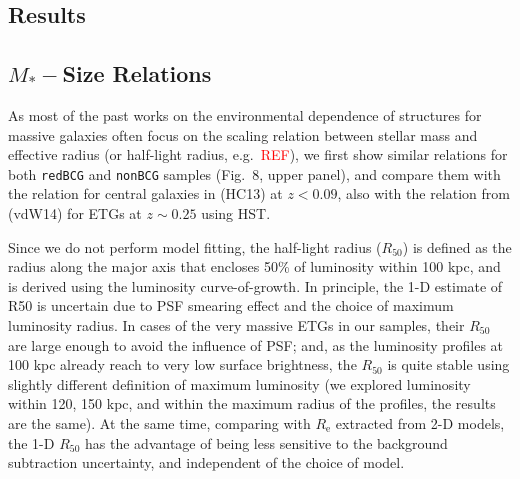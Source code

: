 \documentclass[preprint]{aastex}
\newcommand{\addref}{{\textcolor{red}{REF}}}
\begin{document}
\begin{CJK*}{UTF8}{gbsn}

\section{Results}

\subsection{$M_{\ast}-$Size Relations}

    As most of the past works on the environmental dependence of structures for 
    massive galaxies often focus on the scaling relation between stellar mass
    and effective radius (or half-light radius, e.g.\ \addref), we first show 
    similar relations for both \texttt{redBCG} and \texttt{nonBCG} samples
    (Fig.~8, upper panel), and compare them with the relation for central 
    galaxies in \citealt{HCompany13} (HC13) at $z<0.09$, also with the relation 
    from \citealt{vanderWel2014} (vdW14) for ETGs at $z\sim 0.25$ using HST.
      
    Since we do not perform model fitting, the half-light radius 
    ($R_{\mathrm{50}}$) is defined as the radius along the major axis that 
    encloses 50\% of luminosity within 100 kpc, and is derived using the 
    luminosity curve-of-growth. 
    In principle, the 1-D estimate of R50 is uncertain due to PSF smearing 
    effect and the choice of maximum luminosity radius. 
    In cases of the very massive ETGs in our samples, their $R_{\mathrm{50}}$ 
    are large enough to avoid the influence of PSF; and, as the luminosity 
    profiles at 100 kpc already reach to very low surface brightness, the 
    $R_{\mathrm{50}}$ is quite stable using slightly different definition of 
    maximum luminosity (we explored luminosity within 120, 150 kpc, and within 
    the maximum radius of the profiles, the results are the same). 
    At the same time, comparing with $R_{\mathrm{e}}$ extracted from 2-D 
    models, the 1-D $R_{\mathrm{50}}$ has the advantage of being less sensitive 
    to the background subtraction uncertainty, and independent of the choice 
    of model. 
    

\end{CJK*}
\end{document}
